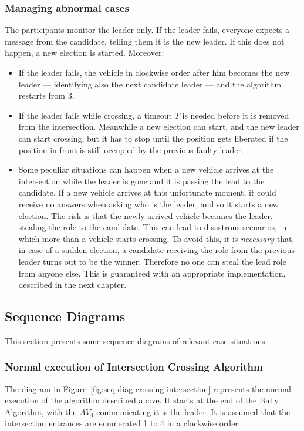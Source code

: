 \documentclass{memoir}
\begin{document}
\subsubsection{Managing abnormal cases}\label{subsec:abnormal-cases}

The participants monitor the leader only. If the leader fails, everyone expects a message from the candidate, telling them it is the new leader. If this does not happen, a new election is started. Moreover:

\begin{itemize}
	\item If the leader fails, the vehicle in clockwise order after him becomes the new leader --- identifying also the next candidate leader --- and the algorithm restarts from 3.
	\item If the leader fails while crossing, a timeout $T$ is needed before it is removed from the intersection. Meanwhile a new election can start, and the new leader can start crossing, but it has to stop until the position gets liberated if the position in front is still occupied by the previous faulty leader.
	\item Some peculiar situations can happen when a new vehicle arrives at the intersection while the leader is gone and it is passing the lead to the candidate. If a new vehicle arrives at this unfortunate moment, it could receive no answers when asking who is the leader, and so it starts a new election. The risk is that the newly arrived vehicle becomes the leader, stealing the role to the candidate. This can lead to disastrous scenarios, in which more than a vehicle starts crossing. To avoid this, it is \emph{necessary} that, in case of a sudden election, a candidate receiving the role from the previous leader turns out to be the winner. Therefore no one can steal the lead role from anyone else. This is guaranteed with an appropriate implementation, described in the next chapter.
\end{itemize}

\subsection{Sequence Diagrams}
This section presents some sequence diagrams of relevant case situations.

\subsubsection{Normal execution of Intersection Crossing Algorithm}
The diagram in Figure~\ref{fig:seq-diag-crossing-intersection} represents the normal execution of the algorithm described above. It starts at the end of the Bully Algorithm, with the $AV_4$ communicating it is the leader. It is assumed that the intersection entrances are enumerated 1 to 4 in a clockwise order.
\end{document}
